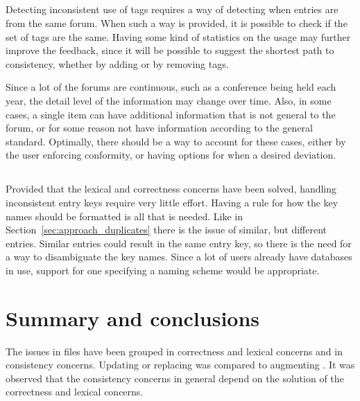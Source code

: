 \subsection{}

Detecting inconsistent use of tags requires a way of detecting when
entries are from the same forum.  When such a way is provided, it is
possible to check if the set of tags are the same.  Having some kind
of statistics on the usage may further improve the feedback, since it
will be possible to suggest the shortest path to consistency, whether
by adding or by removing tags.

Since a lot of the forums are continuous, such as a conference being
held each year, the detail level of the information may change over
time.  Also, in some cases, a single item can have additional
information that is not general to the forum, or for some reason not
have information according to the general standard.  Optimally, there
should be a way to account for these cases, either by the user
enforcing conformity, or having options for when a desired deviation.


\subsection{}

Provided that the lexical and correctness concerns have been solved,
handling inconsistent entry keys require very little effort.  Having a
rule for how the key names should be formatted is all that is needed.
Like in Section~\ref{sec:approach_duplicates} there is the issue of
similar, but different entries.  Similar entries could result in the
same entry key, so there is the need for a way to disambiguate the key
names.  Since a lot of users already have databases in use, support
for one specifying a naming scheme would be appropriate.


\section{Summary and conclusions}

The issues in {\bibtex} files have been grouped in correctness and
lexical concerns and in consistency concerns.  Updating or replacing
{\bibtex} was compared to augmenting {\bibtex}.  It was observed that
the consistency concerns in general depend on the solution of the
correctness and lexical concerns.

